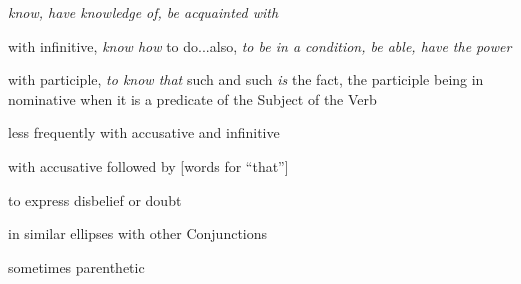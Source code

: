 \begin{compactdesc}
						\begin{compactitem}
							\item[I.1] \textit{know, have knowledge of, be acquainted with}
							\item[I.2] with infinitive, \textit{know how} to do...also, \textit{to be in a condition, be able, have the power}
							\item[I.3] with participle, \textit{to know that} such and such \textit{is} the fact, the participle being in nominative when it is a predicate of the Subject of the Verb
							\item[I.4] less frequently with accusative and infinitive
							\item[I.5] with accusative followed by [words for ``that'']
							\item[I.6] to express disbelief or doubt
							\item[I.7] in similar ellipses with other Conjunctions
							\item[I.8] sometimes parenthetic
						\end{compactitem}
				\end{compactdesc}
				
				\begin{compactdesc}
					\item[Some NT uses] \textbf{}
						\begin{compactdesc}
							\item[]
						\end{compactdesc}
				\end{compactdesc}
				
			\subparagraph{\texorpdfstring{}{}}
				\label{EPIGINOSKO}
			
